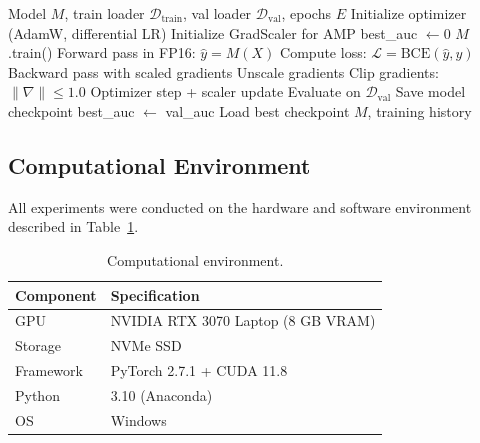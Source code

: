 \documentclass[11pt, a4paper, twocolumn]{article}
\begin{document}
\begin{algorithm}[H]
    \caption{Fine-tuning training loop}
    \label{alg:training}
    \begin{algorithmic}[1]
        \REQUIRE Model $M$, train loader $\mathcal{D}_{\text{train}}$,
                 val loader $\mathcal{D}_{\text{val}}$, epochs $E$
        \STATE Initialize optimizer (AdamW, differential LR)
        \STATE Initialize GradScaler for AMP
        \STATE best\_auc $\leftarrow 0$
            \STATE $M$.train()
                \STATE Forward pass in FP16: $\hat{y} = M(X)$
                \STATE Compute loss: $\mathcal{L} = \text{BCE}(\hat{y}, y)$
                \STATE Backward pass with scaled gradients
                \STATE Unscale gradients
                \STATE Clip gradients: $\|\nabla\| \leq 1.0$
                \STATE Optimizer step + scaler update
            \ENDFOR
            \STATE Evaluate on $\mathcal{D}_{\text{val}}$
                \STATE Save model checkpoint
                \STATE best\_auc $\leftarrow$ val\_auc
            \ENDIF
        \ENDFOR
        \STATE Load best checkpoint
        \RETURN $M$, training history
    \end{algorithmic}
\end{algorithm}

\subsection{Computational Environment}

All experiments were conducted on the hardware and software environment
described in Table~\ref{tab:environment}.

\begin{table}[H]
    \centering
    \caption{Computational environment.}
    \label{tab:environment}
    \begin{tabular}{@{}ll@{}}
        \toprule
        \textbf{Component} & \textbf{Specification} \\
        \midrule
        GPU       & NVIDIA RTX 3070 Laptop (8 GB VRAM) \\
        Storage   & NVMe SSD \\
        Framework & PyTorch 2.7.1 + CUDA 11.8 \\
        Python    & 3.10 (Anaconda) \\
        OS        & Windows \\
        \bottomrule
    \end{tabular}
\end{table}
\end{document}
